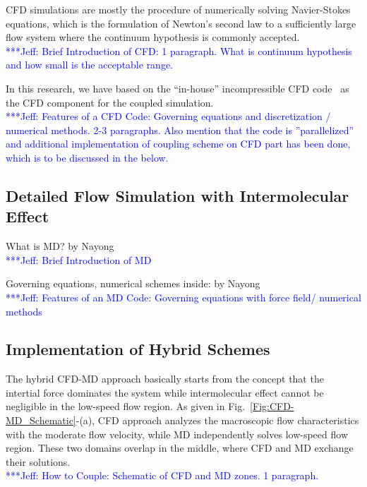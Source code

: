 \documentclass[conference,final]{IEEEtran}
\newcommand{\skonote}[1]{ {\textcolor{blue} { ***Jeff: #1 }}}
\newcommand{\skonote}[1]{}
\begin{document}
CFD simulations are mostly the procedure of numerically solving Navier-Stokes equations, which is the formulation of Newton's second law to a sufficiently large flow system where the continuum hypothesis is commonly accepted.\\
\skonote{Brief Introduction of CFD: 1 paragraph. What is continuum hypothesis and how small is the acceptable range.}
\newline
\newline


In this research, we have based on the ``in-house'' incompressible CFD code~\cite{Lee} as the CFD component for the coupled simulation.\\
\skonote{Features of a CFD Code: Governing equations and discretization / numerical methods. 2-3 paragraphs. Also mention that the code is ''parallelized'' and additional implementation of coupling scheme on CFD part has been done, which is to be discussed in the below.}
\newline
\newline


\subsection{Detailed Flow Simulation with Intermolecular Effect}


What is MD? by Nayong\\
\skonote{Brief Introduction of MD}
\newline
\newline


Governing equations, numerical schemes inside: by Nayong\\
\skonote{Features of an MD Code: Governing equations with force field/ numerical methods}
\newline
\newline


\subsection{Implementation of Hybrid Schemes}


The hybrid CFD-MD approach basically starts from the concept that the intertial force dominates the system while intermolecular effect cannot be negligible in the low-speed flow region. As given in Fig.~\ref{Fig:CFD-MD_Schematic}-(a), CFD approach analyzes the macroscopic flow characteristics with the moderate flow velocity, while MD independently solves low-speed flow region. These two domains overlap in the middle, where CFD and MD exchange their solutions.\\
\skonote{How to Couple: Schematic of CFD and MD zones. 1 paragraph.}
\newline
\newline
\end{document}
